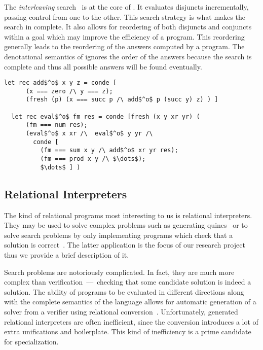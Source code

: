 The \emph{interleaving} search~\cite{10.1145/1090189.1086390} is at the core of \mk.
It evaluates disjuncts incrementally, passing control from one to the other.
This search strategy is what makes the search in \mk complete.
It also allows for reordering of both disjuncts and conjuncts within a goal which may improve the efficiency of a program.
This reordering generally leads to the reordering of the answers computed by a \mk program.
The denotational semantics of \mk ignores the order of the answers because the search is complete and thus all possible answers will be found eventually.

\begin{figure*}[!t]
  \centering
  \begin{minipage}{0.68\textwidth}
    \begin{lstlisting}[label={eval:arith}, caption={Evaluator of arithmetic expressions}, captionpos=b, frame=tb]
  let rec add$^o$ x y z = conde [
      (x === zero /\ y === z);
      (fresh (p) (x === succ p /\ add$^o$ p (succ y) z) ) ]

  let rec eval$^o$ fm res = conde [fresh (x y xr yr) (
      (fm === num res);
      (eval$^o$ x xr /\  eval$^o$ y yr /\
        conde [
          (fm === sum x y /\ add$^o$ xr yr res);
          (fm === prod x y /\ $\dots$);
          $\dots$ ] )
    \end{lstlisting}
  \end{minipage}
\end{figure*}


\subsection{Relational Interpreters}
\label{relinterp}

The kind of relational programs most interesting to us is relational interpreters.
They may be used to solve complex problems such as generating quines~\cite{byrd2012minikanren} or to solve search problems by only implementing programs which check that a solution is correct~\cite{lozov2019relational}.
The latter application is the focus of our research project thus we provide a brief description of it.

Search problems are notoriously complicated.
In fact, they are much more complex than verification~---~checking that some candidate solution is indeed a solution.
The ability of \mk programs to be evaluated in different directions along with the complete semantics of the language allows for automatic generation of a solver from a verifier using relational conversion~\cite{lozov2017typed}.
Unfortunately, generated relational interpreters are often inefficient, since the conversion introduces a lot of extra unifications and boilerplate.
This kind of inefficiency is a prime candidate for specialization.

